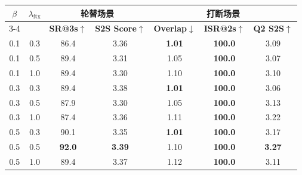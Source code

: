 \begin{table}[!htbp]
    \label{tab:fullduplex_dpo}
    \centering
    \small
    \begin{tabular}{ccccccc}
        \toprule
        \multirow{2}{*}{$\beta$} & \multirow{2}{*}{$\lambda_{\text{ftx}}$} & \multicolumn{2}{c}{\textbf{轮替场景}} & \multicolumn{3}{c}{\textbf{打断场景}} \\
        \cmidrule{3-4} \cmidrule{5-7}
        & & \textbf{SR@3s$\uparrow$} & \textbf{S2S Score$\uparrow$} & \textbf{Overlap$\downarrow$} & \textbf{ISR@2s$\uparrow$} & \textbf{Q2 S2S$\uparrow$} \\
        \midrule
        0.1 & 0.3 & 86.4 & 3.36 & \textbf{1.01} & \textbf{100.0} & 3.09 \\
        0.1 & 0.5 & 89.4 & 3.31 & 1.05 & \textbf{100.0} & 3.07 \\
        0.1 & 1.0 & 89.4 & 3.30 & 1.10 & \textbf{100.0} & 3.10 \\
        0.3 & 0.3 & 89.4 & 3.38 & \textbf{1.01} & \textbf{100.0} & 3.06 \\
        0.3 & 0.5 & 87.9 & 3.30 & 1.05 & \textbf{100.0} & 3.13 \\
        0.3 & 1.0 & 87.4 & 3.36 & 1.11 & \textbf{100.0} & 3.22 \\
        0.5 & 0.3 & 90.1 & 3.35 & \textbf{1.01} & \textbf{100.0} & 3.17 \\
        0.5 & 0.5 & \textbf{92.0} & \textbf{3.39} & 1.10 & \textbf{100.0} & \textbf{3.27} \\
        0.5 & 1.0 & 89.4 & 3.37 & 1.12 & \textbf{100.0} & 3.11 \\
        \bottomrule
    \end{tabular}
\end{table}
